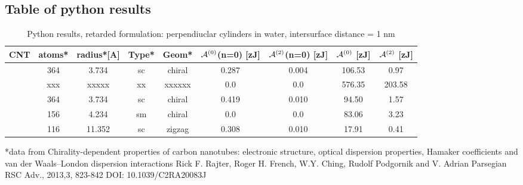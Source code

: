 \documentclass[a4paper]{article}
\begin{document}
\begin{center}
\subsection{Table of python results}
\begin{table}[ht]
\caption{Python results, retarded formulation: perpendiuclar cylinders in water, intersurface distance = 1 nm}
\centering
\begin{tabular}{c|c|c|c|c|c|c|c|c}
  \hline  
  CNT\hspace{0.05in}&atoms*\hspace{0.05in}&radius*[A]\hspace{0.05in}&Type*\hspace{0.05in}&Geom*\hspace{0.05in}&${\cal A}^{(0)}$(n=0)
  [zJ]\hspace{0.05in}&${\cal A}^{(2)}$(n=0) [zJ]\hspace{0.05in}&${\cal A}^{(0)}$
  [zJ]\hspace{0.05in}&${\cal A}^{(2)}$ [zJ]\\
  \hline\hline 
  [6,5]    &364    &3.734      &sc     &chiral     &0.287       &0.004      &106.53     &0.97 \\
  \hline      
  [9,0]    &xxx    &xxxxx      &xx     &xxxxxx     &0.0         &0.0        &576.35     &203.58 \\
  \hline      
  [9,1]    &364    &3.734      &sc     &chiral     &0.419       &0.010      &94.50      &1.57 \\
  \hline      
  [9,3]    &156    &4.234      &sm     &chiral     &0.0         &0.0        &83.06      &3.23 \\
  \hline      
  [29,0]   &116    &11.352     &sc     &zigzag     &0.308       &0.010      &17.91      &0.41 \\
  \hline  
\end{tabular}
\label{table:nonlin}
\end{table}
*data from 
Chirality-dependent properties of carbon nanotubes: electronic structure, optical dispersion properties, Hamaker coefficients and van der Waals–London dispersion interactions
Rick F. Rajter, Roger H. French, W.Y. Ching, Rudolf Podgornik and V. Adrian Parsegian  
RSC Adv., 2013,3, 823-842
DOI: 10.1039/C2RA20083J


\end{center}
\end{document}
